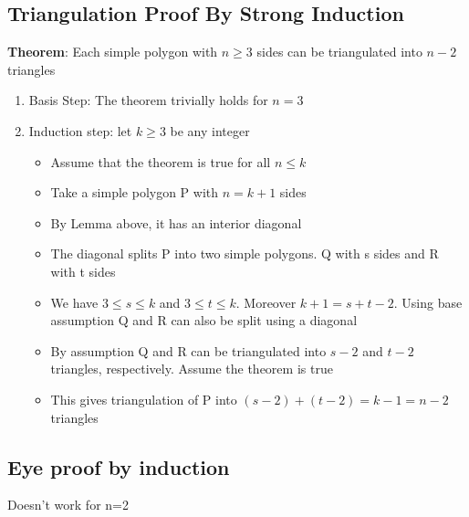 \documentclass{article}[18pt]
\begin{document}
\subsection{Triangulation Proof By Strong Induction}
\textbf{Theorem}: Each simple polygon with $n\geqslant 3$ sides can be triangulated into $n-2$ triangles
\begin{enumerate}
\item Basis Step: The theorem trivially holds for $n=3$
\item Induction step: let $k\geqslant3$ be any integer\begin{itemize}
\item Assume that the theorem is true for all $n\leqslant k$
\item Take a simple polygon P with $n=k+1$ sides
\item By Lemma above, it has an interior diagonal
\item The diagonal splits P into two simple polygons. Q with s sides and R with t sides
\item We have $3\leqslant s\leqslant k$ and $3\leqslant t\leqslant k$. Moreover $k+1=s+t-2$. Using base assumption Q and R can also be split using a diagonal
\item By assumption Q and R can be triangulated into $s-2$ and $t-2$ triangles, respectively. Assume the theorem is true
\item This gives triangulation of P into $(s-2)+(t-2)=k-1=n-2$ triangles
\end{itemize}
\end{enumerate}
\subsection{Eye proof by induction}
Doesn't work for n=2
\end{document}
